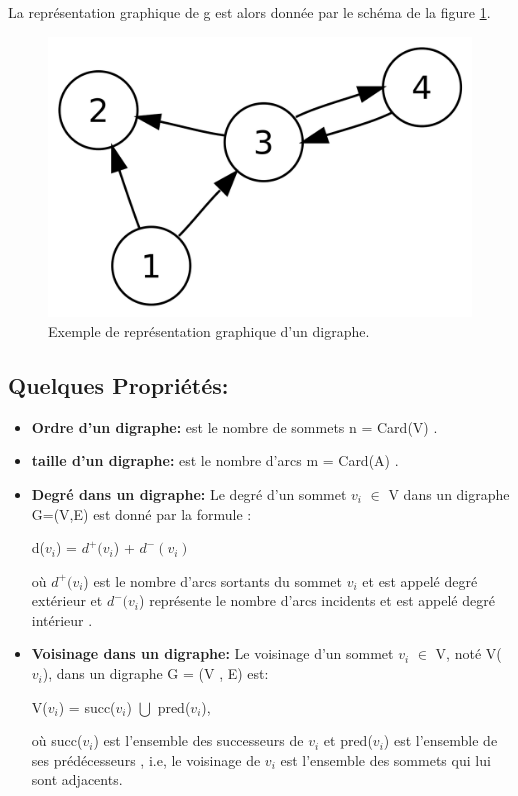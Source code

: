 		La représentation graphique de g est alors donnée par le schéma de la figure \ref{grapheOr}.
	
		
			\begin{figure}[h]
			\includegraphics[scale=0.15,center]{./ressources/image/RepDiGraphe.png}
			\caption[Exemple de représentation graphique d'un digraphe.]{Exemple de représentation graphique d'un digraphe.}
			\label{grapheOr}
			\end{figure}
			
		
		\subsection{Quelques Propriétés:} %
			\begin{itemize}[label=$\circ$]
			\item\textbf{Ordre d'un digraphe:}
			est le nombre de sommets n = Card(V) \citep{DUT}.
			
			\item\textbf{taille d'un digraphe:} est le nombre d’arcs m = Card(A) \citep{DUT}.
			
			\item\textbf{Degré dans un digraphe:}
			Le degré d'un sommet $v_{i}$ $\in$ V dans un digraphe G=(V,E) est donné par la formule :
			\begin{center}
				d($v_{i}$) = $d^+(v_{i}$) + $d^-(v_{i})$\\
			\end{center}			 
			 où $d^+(v_{i}$) est le nombre d'arcs sortants du sommet $v_{i}$ et est appelé degré extérieur et $d^-(v_{i}$) représente le nombre d'arcs incidents et est appelé degré intérieur \citep{muller}.
			 
			 \item\textbf{Voisinage dans un digraphe:}
			 Le voisinage d'un sommet $v_{i}$ $\in$ V, noté V($v_{i}$), dans un digraphe G = (V , E) est:
			 	\begin{center}
				V($v_{i}$) = succ($v_{i}$) $\bigcup$ pred($v_{i}$),
				\end{center}
				
				où succ($v_{i}$) est l'ensemble des successeurs de $v_{i}$ et pred($v_{i}$) est l'ensemble de ses prédécesseurs \citep{bac}, i.e, le voisinage de $v_{i}$ est l'ensemble des sommets qui lui sont adjacents.
			
			\end{itemize}
			
